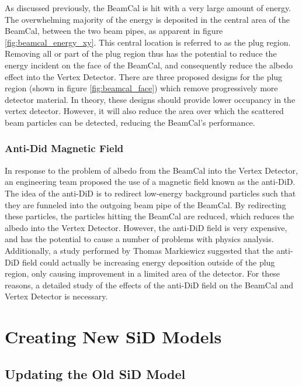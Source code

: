 \documentclass{report}
\begin{document}
                As discussed previously, the BeamCal is hit with a very large amount of energy. The overwhelming majority of the energy is deposited in the central area of the BeamCal, between the two beam pipes, as apparent in figure \ref{fig:beamcal_energy_xy}. This central location is referred to as the plug region. Removing all or part of the plug region thus has the potential to reduce the energy incident on the face of the BeamCal, and consequently reduce the albedo effect into the Vertex Detector. There are three proposed designs for the plug region (shown in figure \ref{fig:beamcal_face}) which remove progressively more detector material. In theory, these designs should provide lower occupancy in the vertex detector. However, it will also reduce the area over which the scattered beam particles can be detected, reducing the BeamCal's performance.


            \subsection{Anti-Did Magnetic Field}
                In response to the problem of albedo from the BeamCal into the Vertex Detector, an engineering team proposed the use of a magnetic field known as the anti-DiD. The idea of the anti-DiD is to redirect low-energy background particles such that they are funneled into the outgoing beam pipe of the BeamCal. By redirecting these particles, the particles hitting the BeamCal are reduced, which reduces the albedo into the Vertex Detector. However, the anti-DiD field is very expensive, and has the potential to cause a number of problems with physics analysis. Additionally, a study performed by Thomas Markiewicz \cite{anti-did} suggested that the anti-DiD field could actually be increasing energy deposition outside of the plug region, only causing improvement in a limited area of the detector. For these reasons, a detailed study of the effects of the anti-DiD field on the BeamCal and Vertex Detector is necessary.





    \chapter{Creating New SiD Models}
        \section{Updating the Old SiD Model}
            
\end{document}
